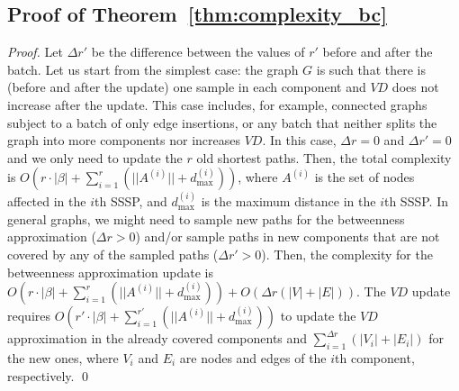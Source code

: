 \documentclass[english]{llncs}
\newcommand{\vd}{$\mathit{VD}$\xspace}
\begin{document}
\subsection{Proof of Theorem~\ref{thm:complexity_bc}}
\label{sub:proof_complexity_bc}
\begin{proof}
Let $\Delta r'$ be the difference between the values of $r'$ before and after the batch. Let us start from the simplest case: the graph $G$ is such that there is (before and after the update) one sample in each component and \vd does not increase after the update. This case includes, for example, connected graphs subject to a batch of only edge insertions, or any batch that neither splits the graph into more components nor increases \vd. In this case, $\Delta r=0$ and $\Delta r'=0$ and we only need to update the $r$ old shortest paths. Then, the total complexity is $O(r\cdot |\beta | + \sum_{i=1}^r (||A^{(i)}||+d_{\max}^{(i)}))$, where $A^{(i)}$ is the set of nodes affected in the $i$th SSSP, and $d_{\max}^{(i)}$ is the maximum distance in the $i$th SSSP. In general graphs, we might need to sample new paths for the betweenness approximation ($\Delta r>0$) and/or sample paths in new components that are not covered by any of the sampled paths ($\Delta r'>0$). Then, the complexity for the betweenness approximation update is $O(r\cdot |\beta | + \sum_{i=1}^r (||A^{(i)}||+d_{\max}^{(i)})) + O(\Delta r (|V|+|E|))$. The \vd update requires $O(r'\cdot |\beta | + \sum_{i=1}^{r'} (||A^{(i)}||+d_{\max}^{(i)}))$ to update the \vd approximation in the already covered components and $\sum_{i=1}^{\Delta r}(|V_i|+|E_i|)$ for the new ones, where $V_i$ and $E_i$ are nodes and edges of the $i$th component, respectively. \qed
\end{proof}
\end{document}
